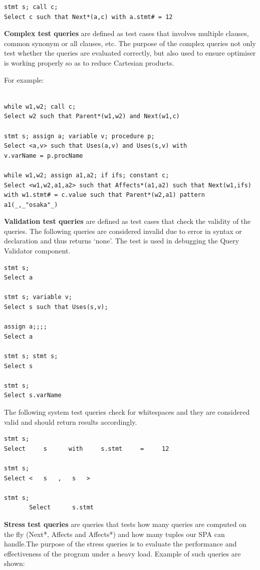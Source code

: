 \documentclass[12pt]{article}
\begin{document}
{{{{{{{{{{{{{\begin{verbatim}
stmt s; call c;
Select c such that Next*(a,c) with a.stmt# = 12

\end{verbatim}

\textbf{Complex test queries} are defined as test cases that involves multiple clauses, common synonym or all clauses, etc. The purpose of the complex queries not only test whether the queries are evaluated correctly, but also used to ensure optimiser is working properly so as to reduce Cartesian products.

For example:
\begin{verbatim}

while w1,w2; call c;
Select w2 such that Parent*(w1,w2) and Next(w1,c)

stmt s; assign a; variable v; procedure p;
Select <a,v> such that Uses(a,v) and Uses(s,v) with 
v.varName = p.procName

while w1,w2; assign a1,a2; if ifs; constant c;
Select <w1,w2,a1,a2> such that Affects*(a1,a2) such that Next(w1,ifs) 
with w1.stmt# = c.value such that Parent*(w2,a1) pattern a1(_,_"osaka"_)
\end{verbatim}

\textbf{Validation test queries} are defined as test cases that check the validity of the queries. The following queries are considered invalid due to error in syntax or declaration and thus returns ‘none’. The test is used in debugging the Query Validator component.

\begin{verbatim}
stmt s;
Select a

stmt s; variable v;
Select s such that Uses(s,v);

assign a;;;;
Select a

stmt s; stmt s;
Select s

stmt s;
Select s.varName
\end{verbatim}

The following system test queries check for whitespaces and they are considered valid and should return results accordingly.
\begin{verbatim}
stmt s;
Select     s      with     s.stmt     =     12

stmt s;
Select <   s   ,   s   >

stmt s;
       Select      s.stmt

\end{verbatim}

\textbf{Stress test queries} are queries that tests how many queries are computed on the fly (Next*, Affects and Affects*) and how many tuples our SPA can handle.The purpose of the stress queries is to evaluate the performance and effectiveness of the program under a heavy load. Example of such queries are shown:

}}}}}}}}}}}}}
\end{document}
